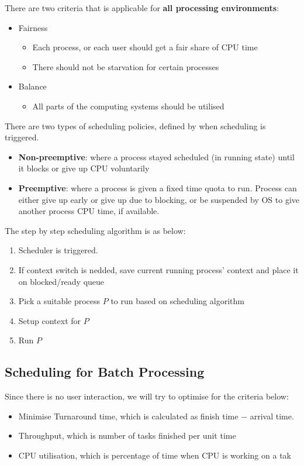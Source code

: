 \documentclass[11pt]{article}
\theoremstyle{definition}
\begin{document}
There are two criteria that is applicable for \textbf{all processing environments}:
\begin{itemize}[itemsep=0pt]
  \item Fairness
  \begin{itemize}[itemsep=0pt]
    \item Each process, or each user should get a fair share of CPU time
    \item There should not be starvation for certain processes
  \end{itemize}
  \item Balance
  \begin{itemize}[itemsep=0pt]
    \item All parts of the computing systems should be utilised
  \end{itemize}
\end{itemize}
There are two types of scheduling policies, defined by when scheduling is triggered.
\begin{itemize}[itemsep=0pt]
  \item \textbf{Non-preemptive}: where a process stayed scheduled (in running state) until it blocks or give up CPU voluntarily
  \item \textbf{Preemptive}: where a process is given a fixed time quota to run. Process can either give up early or give up due to blocking, or be suspended by OS to give another process CPU time, if available.
\end{itemize}

The step by step scheduling algorithm is as below:
\begin{enumerate}
  \item Scheduler is triggered.
  \item If context switch is nedded, save current running process' context and place it on blocked/ready queue
  \item Pick a suitable process $P$ to run based on scheduling algorithm
  \item Setup context for $P$
  \item Run $P$
\end{enumerate}
\subsection{Scheduling for Batch Processing}
Since there is no user interaction, we will try to optimise for the criteria below:
\begin{itemize}[itemsep=0pt]
  \item Minimise Turnaround time, which is calculated as finish time $-$ arrival time.
  \item Throughput, which is number of tasks finished per unit time
  \item CPU utilisation, which is percentage of time when CPU is working on a tak
\end{itemize}
\end{document}
